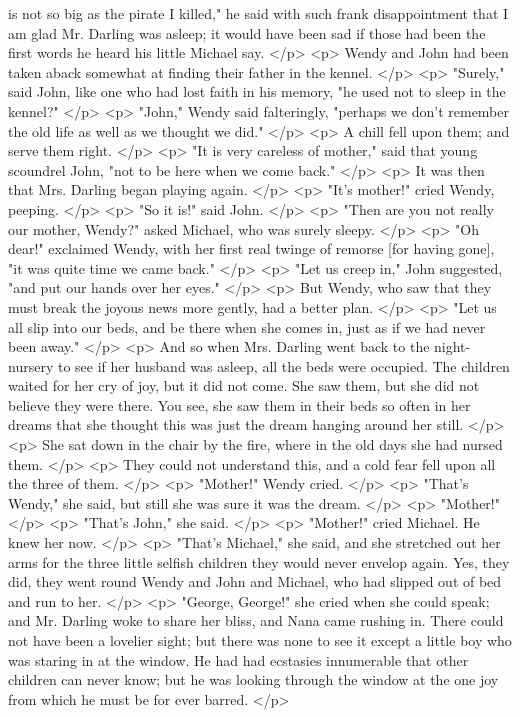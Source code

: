       is not so big as the pirate I killed," he said with such frank
      disappointment that I am glad Mr. Darling was asleep; it would have been
      sad if those had been the first words he heard his little Michael say.
    </p>
    <p>
      Wendy and John had been taken aback somewhat at finding their father in
      the kennel.
    </p>
    <p>
      "Surely," said John, like one who had lost faith in his memory, "he used
      not to sleep in the kennel?"
    </p>
    <p>
      "John," Wendy said falteringly, "perhaps we don't remember the old life as
      well as we thought we did."
    </p>
    <p>
      A chill fell upon them; and serve them right.
    </p>
    <p>
      "It is very careless of mother," said that young scoundrel John, "not to
      be here when we come back."
    </p>
    <p>
      It was then that Mrs. Darling began playing again.
    </p>
    <p>
      "It's mother!" cried Wendy, peeping.
    </p>
    <p>
      "So it is!" said John.
    </p>
    <p>
      "Then are you not really our mother, Wendy?" asked Michael, who was surely
      sleepy.
    </p>
    <p>
      "Oh dear!" exclaimed Wendy, with her first real twinge of remorse [for
      having gone], "it was quite time we came back."
    </p>
    <p>
      "Let us creep in," John suggested, "and put our hands over her eyes."
    </p>
    <p>
      But Wendy, who saw that they must break the joyous news more gently, had a
      better plan.
    </p>
    <p>
      "Let us all slip into our beds, and be there when she comes in, just as if
      we had never been away."
    </p>
    <p>
      And so when Mrs. Darling went back to the night-nursery to see if her
      husband was asleep, all the beds were occupied. The children waited for
      her cry of joy, but it did not come. She saw them, but she did not believe
      they were there. You see, she saw them in their beds so often in her
      dreams that she thought this was just the dream hanging around her still.
    </p>
    <p>
      She sat down in the chair by the fire, where in the old days she had
      nursed them.
    </p>
    <p>
      They could not understand this, and a cold fear fell upon all the three of
      them.
    </p>
    <p>
      "Mother!" Wendy cried.
    </p>
    <p>
      "That's Wendy," she said, but still she was sure it was the dream.
    </p>
    <p>
      "Mother!"
    </p>
    <p>
      "That's John," she said.
    </p>
    <p>
      "Mother!" cried Michael. He knew her now.
    </p>
    <p>
      "That's Michael," she said, and she stretched out her arms for the three
      little selfish children they would never envelop again. Yes, they did,
      they went round Wendy and John and Michael, who had slipped out of bed and
      run to her.
    </p>
    <p>
      "George, George!" she cried when she could speak; and Mr. Darling woke to
      share her bliss, and Nana came rushing in. There could not have been a
      lovelier sight; but there was none to see it except a little boy who was
      staring in at the window. He had had ecstasies innumerable that other
      children can never know; but he was looking through the window at the one
      joy from which he must be for ever barred.
    </p>
